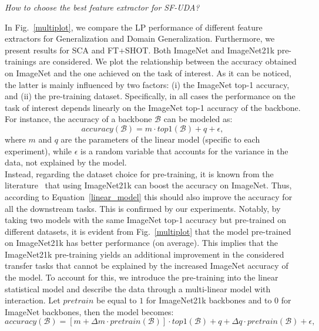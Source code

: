 \documentclass{article}
\begin{document}
\textit{How to choose the best feature extractor for SF-UDA?}

In Fig.~\ref{multiplot}, we compare the LP performance of different feature extractors for Generalization and Domain Generalization.
Furthermore, we present results for SCA and FT+SHOT. 
Both ImageNet and ImageNet21k pre-trainings are considered. 
We plot the relationship between the accuracy obtained on ImageNet and the one achieved on the task of interest. 
As it can be noticed, the latter is mainly influenced by two factors: (i) the ImageNet top-1 accuracy, and (ii) the pre-training dataset.
Specifically, in all cases the performance on the task of interest depends linearly on the ImageNet top-1 accuracy of the backbone. 
For instance, the accuracy of a backbone $\mathcal{B}$ can be modeled as:
\begin{equation}
\label{linear_model}
    accuracy(\mathcal{B}) = m \cdot top1(\mathcal{B}) + q + \epsilon,
\end{equation}
\noindent where $m$ and $q$ are the parameters of the linear model (specific to each experiment), while $\epsilon$ is a random variable that accounts for the variance in the data, not explained by the model.\\
Instead, regarding the dataset choice for pre-training, it is known from the literature~\citep{dosovitskiy2020image} that using ImageNet21k can boost the accuracy on ImageNet. 
Thus, according to Equation~\ref{linear_model} this should also improve the accuracy for all the downstream tasks. 
This is confirmed by our experiments. Notably, by taking two models with the same ImageNet top-1 accuracy but pre-trained on different datasets, it is evident from Fig.~\ref{multiplot} that the model pre-trained on ImageNet21k has better performance (on average). 
This implies that the ImageNet21k pre-training yields an additional improvement in the considered transfer tasks that cannot be explained by the increased ImageNet accuracy of the model.
To account for this, we introduce the pre-training into the linear statistical model and describe the data through a multi-linear model with interaction. 
Let $pretrain$ be equal to $1$ for ImageNet21k backbones and to $0$ for ImageNet backbones, then the model becomes: 
\begin{equation}
    accuracy(\mathcal{B}) = [m + \Delta m \cdot pretrain(\mathcal{B})] \cdot top1(\mathcal{B}) + q + \Delta q \cdot pretrain(\mathcal{B}) + \epsilon,
\end{equation}
\end{document}
